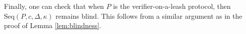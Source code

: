 \documentclass[11pt]{article}
\begin{document}
 Finally, one can check that when $P$ is the verifier-on-a-leash protocol, then $\mbox{Seq}(P,c,\Delta, \kappa)$ remains blind. This follows from a similar argument as in the proof of Lemma \ref{lem:blindness}.






\end{document}
